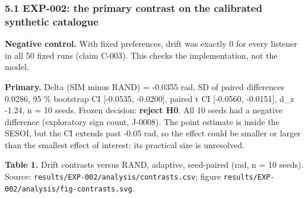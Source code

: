 \documentclass[
]{article}
\begin{document}
\subsubsection{5.1 EXP-002: the primary contrast on the calibrated
synthetic
catalogue}\label{exp-002-the-primary-contrast-on-the-calibrated-synthetic-catalogue}

\textbf{Negative control.} With fixed preferences, drift was exactly 0
for every listener in all 50 fixed runs (claim C-003). This checks the
implementation, not the model.

\textbf{Primary.} Delta (SIM minus RAND) = -0.0355 rad, SD of paired
differences 0.0286, 95 \% bootstrap CI {[}-0.0535, -0.0200{]}, paired t
CI {[}-0.0560, -0.0151{]}, d\_z -1.24, n = 10 seeds. Frozen decision:
\textbf{reject H0}. All 10 seeds had a negative difference (exploratory
sign count, J-0008). The point estimate is inside the SESOI, but the CI
extends past -0.05 rad, so the effect could be smaller or larger than
the smallest effect of interest: its practical size is unresolved.

\textbf{Table 1.} Drift contrasts versus RAND, adaptive, seed-paired
(rad, n = 10 seeds). Source:
\texttt{results/EXP-002/analysis/contrasts.csv}; figure
\texttt{results/EXP-002/analysis/fig-contrasts.svg}.
\end{document}
